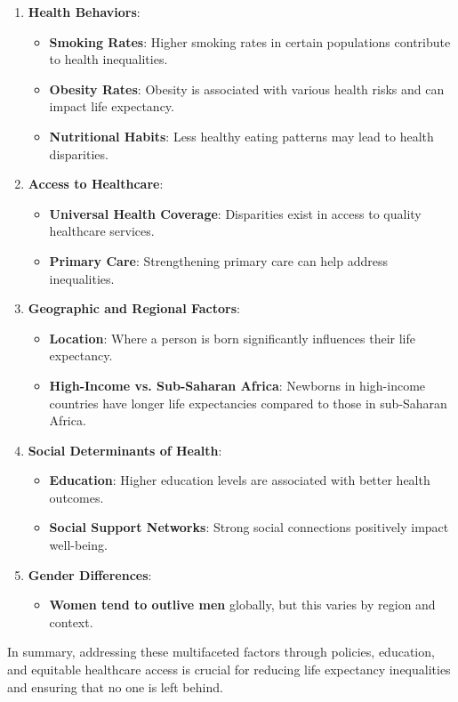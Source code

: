 \documentclass[11pt]{report}
\begin{document}
\begin{spacing}{1.5}
\begin{enumerate}[leftmargin=15ex]
		\item \textbf{Health Behaviors}:
		\begin{itemize}
			\item \textbf{Smoking Rates}: Higher smoking rates in certain populations contribute to health inequalities.
			\item \textbf{Obesity Rates}: Obesity is associated with various health risks and can impact life expectancy.
			\item \textbf{Nutritional Habits}: Less healthy eating patterns may lead to health disparities.
		\end{itemize}
		
		\item \textbf{Access to Healthcare}:
		\begin{itemize}
			\item \textbf{Universal Health Coverage}: Disparities exist in access to quality healthcare services.
			\item \textbf{Primary Care}: Strengthening primary care can help address inequalities.
		\end{itemize}
		
		\item \textbf{Geographic and Regional Factors}:
		\begin{itemize}
			\item \textbf{Location}: Where a person is born significantly influences their life expectancy.
			\item \textbf{High-Income vs. Sub-Saharan Africa}: Newborns in high-income countries have longer life expectancies compared to those in sub-Saharan Africa.
		\end{itemize}
		
		\item \textbf{Social Determinants of Health}:
		\begin{itemize}
			\item \textbf{Education}: Higher education levels are associated with better health outcomes.
			\item \textbf{Social Support Networks}: Strong social connections positively impact well-being.
		\end{itemize}
		
		\item \textbf{Gender Differences}:
		\begin{itemize}
			\item \textbf{Women tend to outlive men} globally, but this varies by region and context.
		\end{itemize}
		
	\end{enumerate}
	
	In summary, addressing these multifaceted factors through policies, education, and equitable healthcare access is crucial for reducing life expectancy inequalities and ensuring that no one is left behind.
	

\end{spacing}
\end{document}

